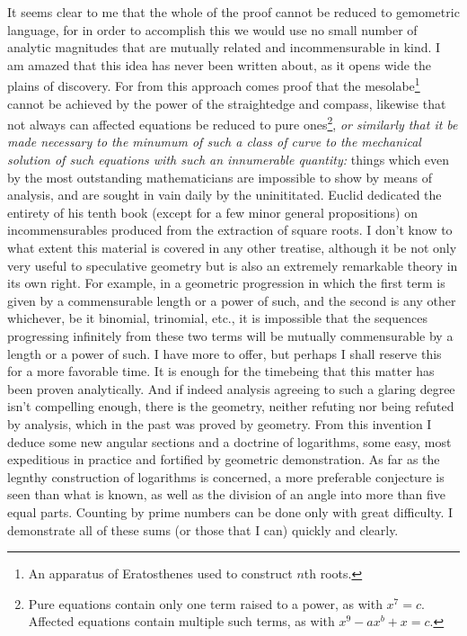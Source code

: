 \documentclass[11pt,letterpaper]{book}
\begin{document}
It seems clear to me that the whole of the proof cannot be reduced to
gemometric language, for in order to accomplish this we would use no small
number of analytic magnitudes that are mutually related and
incommensurable in kind.  I am amazed that this idea has never been written
about, as it opens wide the plains of discovery.
For from this approach comes proof that the mesolabe\footnote{An
apparatus of Eratosthenes used to construct $n$th roots.} cannot be achieved by
the power of the straightedge and compass, likewise that not always can
affected equations be reduced to pure ones\footnote{Pure equations contain
only one term raised to a power, as with $x^7 = c$.  Affected equations contain
multiple such terms, as with $x^9-ax^b+x = c$.}, 
\emph{or similarly that it be made necessary to
the minumum of such a class of curve to the mechanical solution of such
equations with such an innumerable quantity:} 
things which even by the most outstanding mathematicians are impossible to show
by means of analysis, and are sought in vain daily by the uninititated.
Euclid dedicated the entirety of his tenth book (except for a few minor general
propositions) on incommensurables produced from the extraction of square roots.
I don't know to what extent this material is covered in any other treatise,
although it be not only very useful to speculative geometry but is also an
extremely remarkable theory in its own right.
For example, in a geometric progression in which the first term is given by a
commensurable length or a power of such, and the second is any
other whichever, be it binomial, trinomial, etc., it is impossible that the
sequences progressing infinitely from these two terms will be mutually
commensurable by a length or a power of such.
I have more to offer, but perhaps I shall reserve this for a more favorable
time.
It is enough for the timebeing that this matter has been proven analytically.
And if indeed analysis agreeing to such a glaring degree isn't compelling
enough, there is the geometry, neither refuting nor being refuted by
analysis, which in the past was proved by geometry.
From this invention I deduce some new angular sections and a doctrine of
logarithms, some easy, most expeditious in practice and fortified by geometric
demonstration.
As far as the legnthy construction of logarithms is concerned, a more preferable
conjecture is seen than what is known, as well as the division of an angle into
more than five equal parts.
Counting by prime numbers can be done only with great difficulty.
I demonstrate all of these sums (or those that I can) quickly and clearly.
\end{document}

